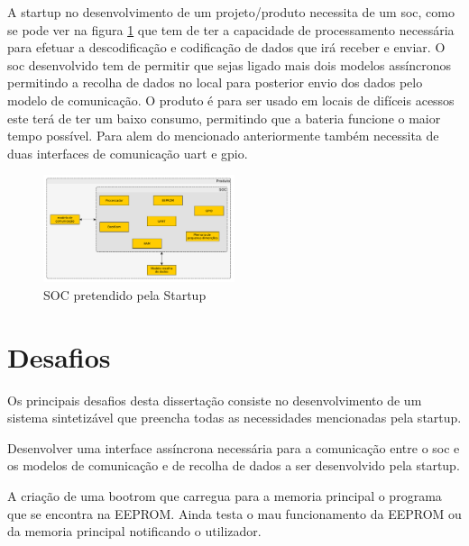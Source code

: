 A startup no desenvolvimento de um projeto/produto necessita de um \acrshort{soc}, como se pode ver na figura \ref{grafos:problema} que tem de ter a capacidade de processamento necessária para efetuar a descodificação e codificação de dados que irá receber e enviar. O \acrshort{soc} desenvolvido tem de permitir que sejas ligado mais dois modelos assíncronos permitindo a recolha de dados no local para posterior envio dos dados pelo modelo de comunicação. O produto é para ser usado em locais de difíceis acessos este terá de ter um baixo consumo, permitindo que a bateria funcione o maior tempo possível. Para alem do mencionado anteriormente também necessita de duas interfaces de comunicação \acrlong{uart} e \acrlong{gpio}. 

\begin{figure}[!htb]
  \centering
  \includegraphics[width=0.5\textwidth]{grafos/problema.pdf}
  \caption[SOC pretendido pela Startup]{SOC pretendido pela Startup}
  \label{grafos:problema}
\end{figure}


\section{Desafios}
\label{section:desafio}


Os principais desafios desta dissertação consiste no desenvolvimento de um sistema sintetizável que preencha todas as necessidades mencionadas pela startup.

Desenvolver uma interface assíncrona necessária para a comunicação entre o \acrshort{soc} e os modelos de comunicação e de recolha de dados a ser desenvolvido pela startup.

A criação de uma bootrom que carregua para a memoria principal o programa que se encontra na EEPROM. Ainda testa o mau funcionamento da EEPROM ou da memoria principal notificando o utilizador. 
